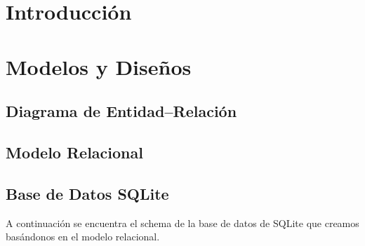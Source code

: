 \documentclass[hidelinks,a4paper,11pt, nofootinbib]{article}
\begin{document}
\maketitle

\tableofcontents
\newpage

\section{Introducción}

\newpage

\section{Modelos y Diseños}
\subsection{Diagrama de Entidad--Relación}

\newpage

\subsection{Modelo Relacional}

\newpage

\subsection{Base de Datos SQLite}
A continuación se encuentra el schema de la base de datos de SQLite que creamos basándonos en el modelo relacional.
\end{document}
